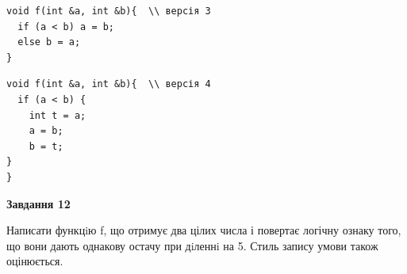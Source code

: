 \documentclass[12pt, ukrainian]{article}
\begin{document}
{\begin {large}
\begin{minipage}[t]{11.0cm}
\vspace{-8mm}\begin{verbatim}
void f(int &a, int &b){  \\ версія 3
  if (a < b) a = b;
  else b = a;
}
\end{verbatim}

\vspace{-8mm}\begin{verbatim}
void f(int &a, int &b){  \\ версія 4
  if (a < b) {
    int t = a;
    a = b;
    b = t;
}  
}
\end{verbatim}



\begin{center}
\textbf{Завдання 12}
\end{center}

Написати функцiю f, що отримує два цілих числа і повертає логічну ознаку того, що вони дають однакову остачу при дiленнi на 5. Стиль запису умови також оцінюється.\par

\end{minipage}

\end {large}}
\newpage
\end{document}
